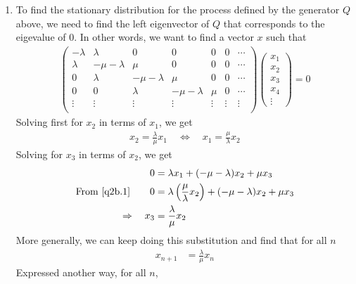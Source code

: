 \documentclass[12pt]{article}
\theoremstyle{plain}
\theoremstyle{definition}
\theoremstyle{remark}
\begin{document}
\begin{enumerate}
\begin{enumerate}
    \item %
      To find the stationary distribution for the process defined by the
      generator $Q$ above, we need to find the left eigenvector of $Q$
      that corresponds to the eigevalue of 0. In other words, we want to
      find a vector $x$ such that
      \begin{align*}
          \begin{pmatrix}
            -\lambda & \lambda & 0 & 0 & 0 & 0 & \cdots \\
            \lambda & -\mu-\lambda & \mu & 0 & 0 & 0 & \cdots\\
            0 & \lambda & -\mu-\lambda & \mu & 0 & 0 & \cdots \\
            0 & 0 & \lambda & -\mu-\lambda & \mu & 0 &  \cdots \\
            \vdots & \vdots  & \vdots & \vdots & \vdots & \vdots & \vdots \\
          \end{pmatrix}
          \begin{pmatrix}
            x_1 \\ x_2 \\ x_3 \\ x_4 \\ \vdots
          \end{pmatrix}
          = 0
      \end{align*}
      Solving first for $x_2$ in terms of $x_1$, we get
      \begin{align}
        x_2 = \frac{\lambda}{\mu} x_1
        \quad \Leftrightarrow \quad
        x_1 = \frac{\mu}{\lambda} x_2
        \label{q2b.1}
      \end{align}
      Solving for $x_3$ in terms of $x_2$, we get
      \begin{align*}
        0 &= \lambda x_1 + (-\mu-\lambda)x_2 + \mu x_3\\
        \text{From~\ref{q2b.1}}
        \qquad
        0 &= \lambda \left(\frac{\mu}{\lambda} x_2\right)
          + (-\mu-\lambda)x_2 + \mu x_3 \\
        \Rightarrow \quad x_3 &= \frac{\lambda}{\mu} x_2
      \end{align*}
      More generally, we can keep doing this substitution and find that
      for all $n$
      \begin{align*}
        x_{n+1} &= \frac{\lambda}{\mu} x_n
      \end{align*}
      Expressed another way, for all $n$,
      \begin{align*}

\end{align*}
\end{enumerate}
\end{enumerate}
\end{document}
